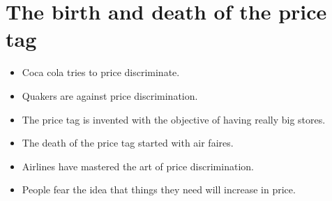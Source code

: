 \documentclass{article}
\begin{document}
\section{The birth and death of the price tag}
\begin{itemize}
    \item Coca cola tries to price discriminate.
    \item Quakers are against price discrimination. 
    \item The price tag is invented with the objective of having really big stores. 
    \item The death of the price tag started with air faires. 
    \item Airlines have mastered the art of price discrimination. 
    \item People fear the idea that things they need will increase in price. 
\end{itemize}



\end{document}
